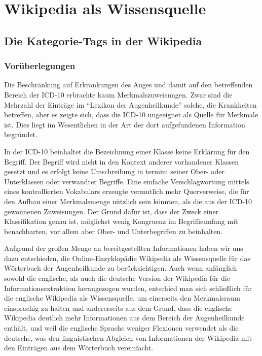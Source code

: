 \documentclass[pagesize,paper=A4,DIV=calc,fontsize=12pt,draft=false]{scrreprt}
\begin{document}
\section{Wikipedia als Wissensquelle}

\subsection{Die Kategorie-Tags in der Wikipedia}
\label{subsec:wiki_cats}

\subsubsection{Vorüberlegungen}

Die Beschränkung auf Erkrankungen des Auges und damit auf den betreffenden Bereich der ICD-10 erbrachte kaum Merkmalszuweisungen.
Zwar sind die Mehrzahl der Einträge im \enquote{Lexikon der Augenheilkunde} solche, die Krankheiten betreffen, aber es zeigte sich, dass die ICD-10 ungeeignet als Quelle für Merkmale ist. 
Dies liegt im Wesentlichen in der Art der dort aufgefundenen Information begründet. 

In der ICD-10 beinhaltet die Bezeichnung einer Klasse keine Erklärung für den Begriff. 
Der Begriff wird nicht in den Kontext anderer vorhandener Klassen gesetzt und es erfolgt keine Umschreibung in termini seiner Ober- oder Unterklassen oder verwandter Begriffe. 
Eine einfache Verschlagwortung mittels eines kontrollierten Vokabulars erzeugte vermutlich mehr Querverweise, die für den Aufbau einer Merkmalsmenge nützlich sein könnten, als die aus der ICD-10 gewonnenen Zuweisungen. 
Der Grund dafür ist, dass der Zweck einer Klassifikation genau ist, möglichst wenig Kongruenz im Begriffsumfang mit benachbarten, vor allem aber Ober- und Unterbegriffen zu beinhalten. 

Aufgrund der großen Menge an bereitgestellten Informationen haben wir uns dazu entschieden, die Online-Enzyklopädie Wikipedia als Wissensquelle für das Wörterbuch der Augenheilkunde zu berücksichtigen. 
Auch wenn anfänglich sowohl die englische, als auch die deutsche Version der Wikipedia für die Informationsextraktion herangezogen wurden, entschied man sich schließlich für die englische Wikipedia als Wissensquelle, um einerseits den Merkmalsraum einsprachig zu halten und andererseits aus dem Grund, dass die englische Wikipedia deutlich mehr Informationen aus dem Bereich der Augenheilkunde enthält, und weil die englische Sprache weniger Flexionen verwendet als die deutsche, was den linguistischen Abgleich von Informationen der Wikipedia mit den Einträgen aus dem Wörterbuch vereinfacht. 
\end{document}
